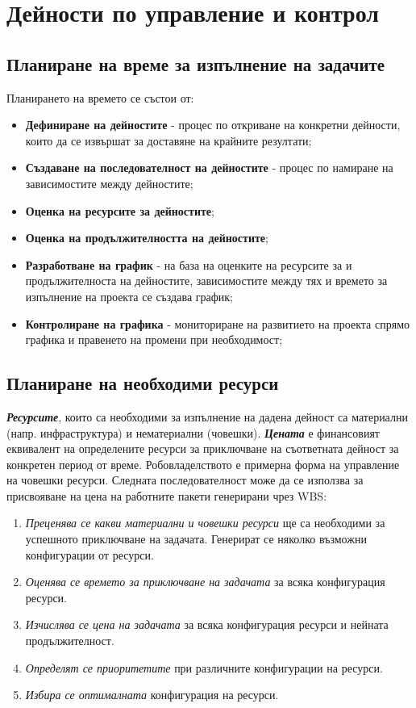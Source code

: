 \documentclass[fleqn,12pt]{article}
\begin{document}
\section{Дейности по управление и контрол}

\subsection{Планиране на време за изпълнение на задачите}

Планирането на времето се състои от:
\begin{itemize}
    \item \textbf{Дефиниране на дейностите} - процес по откриване на конкретни дейности, които да се извършат за доставяне на крайните резултати;
    \item \textbf{Създаване на последователност на дейностите} - процес по намиране на зависимостите между дейностите;
    \item \textbf{Оценка на ресурсите за дейностите};
    \item \textbf{Оценка на продължителността на дейностите};
    \item \textbf{Разработване на график} - на база на оценките на ресурсите за и продължителноста на дейностите, зависимостите между тях и времето за изпълнение на проекта се създава график;
    \item \textbf{Контролиране на графика} - мониториране на развитието на проекта спрямо графика и правенето на промени при необходимост;
\end{itemize}

\subsection{Планиране на необходими ресурси}

\textit{\textbf{Ресурсите}}, които са необходими за изпълнение на дадена дейност са материални (напр. инфраструктура) и нематериални (човешки).
\textit{\textbf{Цената}} е финансовият еквивалент на определените ресурси за приключване на съответната дейност за конкретен период от време.
Робовладелството е примерна форма на управление на човешки ресурси.
\bigbreak
Следната последователност може да се използва за присвояване на цена на работните пакети генерирани чрез WBS:
\begin{enumerate}
    \item \textit{Преценява се какви материални и човешки ресурси} ще са необходими за успешното приключване на задачата.
    Генерират се няколко възможни конфигурации от ресурси.
    \item \textit{Оценява се времето за приключване на задачата} за всяка конфигурация ресурси.
    \item \textit{Изчислява се цена на задачата} за всяка конфигурация ресурси и нейната продължителност.
    \item \textit{Определят се приоритетите} при различните конфигурации на ресурси.
    \item \textit{Избира се оптималната} конфигурация на ресурси.
\end{enumerate}
\end{document}
